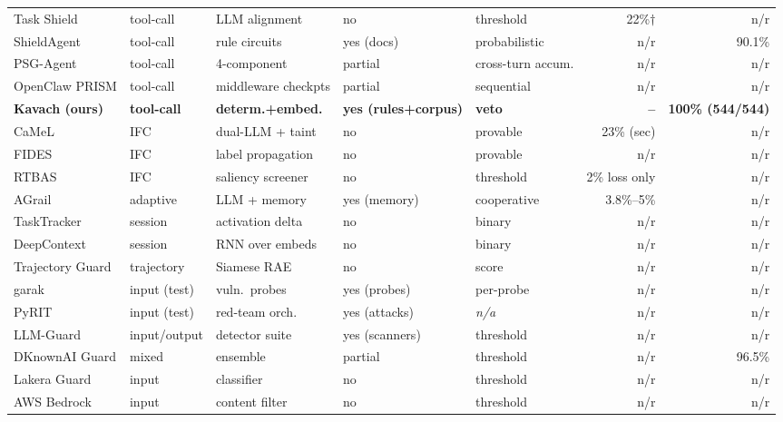 \documentclass[sigconf,anonymous,review]{acmart}
\begin{document}
\begin{table}[tp]
\begin{tabular}{@{}lllllrr@{}}
Task Shield & tool-call & LLM alignment & no & threshold & 22\%$\dagger$ & n/r \\
ShieldAgent & tool-call & rule circuits & yes (docs) & probabilistic & n/r & 90.1\% \\
PSG-Agent & tool-call & 4-component & partial & cross-turn accum. & n/r & n/r \\
OpenClaw PRISM & tool-call & middleware checkpts & partial & sequential & n/r & n/r \\
\textbf{Kavach (ours)} & \textbf{tool-call} & \textbf{determ.+embed.} & \textbf{yes (rules+corpus)} & \textbf{veto} & \textbf{--}\footnotemark & \textbf{100\% (544/544)} \\
\midrule

CaMeL & IFC & dual-LLM + taint & no & provable & 23\% (sec) & n/r \\
FIDES & IFC & label propagation & no & provable & n/r & n/r \\
RTBAS & IFC & saliency screener & no & threshold & 2\% loss only & n/r \\
AGrail & adaptive & LLM + memory & yes (memory) & cooperative & 3.8\%--5\% & n/r \\
\midrule

TaskTracker & session & activation delta & no & binary & n/r & n/r \\
DeepContext & session & RNN over embeds & no & binary & n/r & n/r \\
Trajectory Guard & trajectory & Siamese RAE & no & score & n/r & n/r \\
\midrule

garak \cite{garak2024} & input (test) & vuln.\ probes & yes (probes) & per-probe & n/r & n/r \\
PyRIT \cite{pyrit2024} & input (test) & red-team orch. & yes (attacks) & {\em n/a} & n/r & n/r \\
LLM-Guard \cite{llmguard2024} & input/output & detector suite & yes (scanners) & threshold & n/r & n/r \\
\midrule

DKnownAI Guard & mixed & ensemble & partial & threshold & n/r & 96.5\% \\
Lakera Guard & input & classifier & no & threshold & n/r & n/r \\
AWS Bedrock & input & content filter & no & threshold & n/r & n/r \\


\end{tabular}
\end{table}
\end{document}

